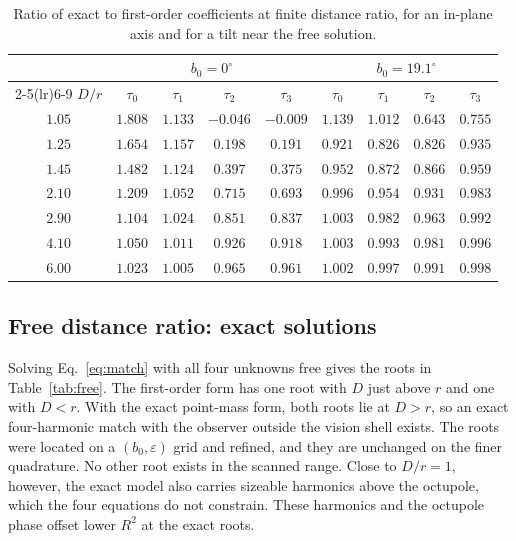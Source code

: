 \documentclass[10pt]{article}
\begin{document}
\begin{table}[!htb]\centering\small
\caption{Ratio of exact to first-order coefficients at finite distance ratio, for an in-plane axis and for a tilt near the free solution.}\label{tab:ratio}
\begin{tabular}{c cccc cccc}\toprule
 & \multicolumn{4}{c}{$b_0=0^\circ$} & \multicolumn{4}{c}{$b_0=19.1^\circ$}\\\cmidrule(lr){2-5}\cmidrule(lr){6-9}
$D/r$ & $\tau_0$ & $\tau_1$ & $\tau_2$ & $\tau_3$ & $\tau_0$ & $\tau_1$ & $\tau_2$ & $\tau_3$\\\midrule

$1.05$ & $1.808$ & $1.133$ & $-0.046$ & $-0.009$ & $1.139$ & $1.012$ & $0.643$ & $0.755$\\
$1.25$ & $1.654$ & $1.157$ & $0.198$ & $0.191$ & $0.921$ & $0.826$ & $0.826$ & $0.935$\\
$1.45$ & $1.482$ & $1.124$ & $0.397$ & $0.375$ & $0.952$ & $0.872$ & $0.866$ & $0.959$\\
$2.10$ & $1.209$ & $1.052$ & $0.715$ & $0.693$ & $0.996$ & $0.954$ & $0.931$ & $0.983$\\
$2.90$ & $1.104$ & $1.024$ & $0.851$ & $0.837$ & $1.003$ & $0.982$ & $0.963$ & $0.992$\\
$4.10$ & $1.050$ & $1.011$ & $0.926$ & $0.918$ & $1.003$ & $0.993$ & $0.981$ & $0.996$\\
$6.00$ & $1.023$ & $1.005$ & $0.965$ & $0.961$ & $1.002$ & $0.997$ & $0.991$ & $0.998$\\
\bottomrule
\end{tabular}
\end{table}


\subsection{Free distance ratio: exact solutions}
Solving Eq.~\eqref{eq:match} with all four unknowns free gives the roots in Table~\ref{tab:free}. The first-order form has one root with $D$ just above $r$ and one with $D<r$. With the exact point-mass form, both roots lie at $D>r$, so an exact four-harmonic match with the observer outside the vision shell exists. The roots were located on a $(b_0,\varepsilon)$ grid and refined, and they are unchanged on the finer quadrature. No other root exists in the scanned range. Close to $D/r=1$, however, the exact model also carries sizeable harmonics above the octupole, which the four equations do not constrain. These harmonics and the octupole phase offset lower $R^2$ at the exact roots.
\end{document}
